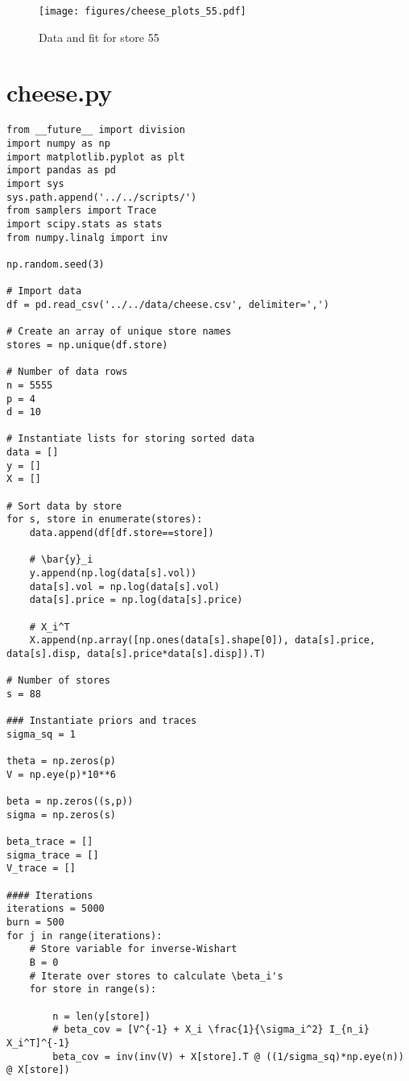 \documentclass[12pt]{article}
\begin{document}
    \begin{figure}[ht] 
      \centering 
      \texttt{[image: figures/cheese\_plots\_55.pdf]}
      \vskip-10pt
      \caption{\label{fig:cheese_55} Data and fit for store 55}
    \end{figure}

    \clearpage

    \appendix

    \section*{cheese.py}
    \begin{lstlisting}
from __future__ import division
import numpy as np 
import matplotlib.pyplot as plt
import pandas as pd
import sys
sys.path.append('../../scripts/')
from samplers import Trace
import scipy.stats as stats
from numpy.linalg import inv

np.random.seed(3)

# Import data
df = pd.read_csv('../../data/cheese.csv', delimiter=',')

# Create an array of unique store names
stores = np.unique(df.store)

# Number of data rows
n = 5555
p = 4
d = 10

# Instantiate lists for storing sorted data
data = []
y = []
X = []

# Sort data by store
for s, store in enumerate(stores):
    data.append(df[df.store==store])

    # \bar{y}_i
    y.append(np.log(data[s].vol))
    data[s].vol = np.log(data[s].vol)
    data[s].price = np.log(data[s].price)

    # X_i^T
    X.append(np.array([np.ones(data[s].shape[0]), data[s].price, data[s].disp, data[s].price*data[s].disp]).T)

# Number of stores
s = 88

### Instantiate priors and traces
sigma_sq = 1

theta = np.zeros(p)
V = np.eye(p)*10**6

beta = np.zeros((s,p))
sigma = np.zeros(s)

beta_trace = []
sigma_trace = []
V_trace = []

#### Iterations
iterations = 5000
burn = 500
for j in range(iterations):
    # Store variable for inverse-Wishart
    B = 0
    # Iterate over stores to calculate \beta_i's
    for store in range(s):

        n = len(y[store])
        # beta_cov = [V^{-1} + X_i \frac{1}{\sigma_i^2} I_{n_i} X_i^T]^{-1}
        beta_cov = inv(inv(V) + X[store].T @ ((1/sigma_sq)*np.eye(n)) @ X[store])


\end{lstlisting}
\end{document}
